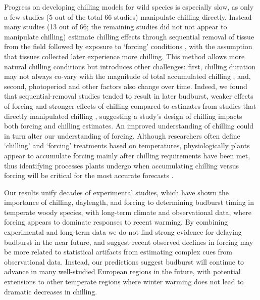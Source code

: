 \documentclass{article}
\begin{document}
\par Progress on developing chilling models for wild species is especially slow, as only a few studies (5 out of the total 66 studies) manipulate chilling directly. Instead many studies (13 out of 66; the remaining studies did not not appear to manipulate chilling) estimate chilling effects through sequential removal of tissue from the field followed by exposure to `forcing' conditions \citep{weinberger1950}, with the assumption that tissues collected later experience more chilling. This method allows more natural chilling conditions but introduces other challenges: first, chilling duration may not always co-vary with the magnitude of total accumulated chilling \citep{dennis2003}, and, second, photoperiod and other factors also change over time. Indeed, we found that sequential-removal studies tended to result in later budburst, weaker effects of forcing and stronger effects of chilling compared to estimates from studies that directly manipulated chilling \citep[Fig. 4S][]{weinberger1950,polgar2013}, suggesting a study's design of chilling impacts both forcing and chilling estimates. An improved understanding of chilling could in turn alter our understanding of forcing. Although researchers often define `chilling' and `forcing' treatments based on temperatures, physiologically plants appear to accumulate forcing mainly after chilling requirements have been met,  thus identifying processes plants undergo when accumulating chilling versus forcing will be critical for the most accurate forecasts \citep{chuine2016}.

\par Our results unify decades of experimental studies, which have shown the importance of chilling, daylength, and forcing to determining budburst timing in temperate woody species, with long-term climate and observational data, where forcing appears to dominate responses to recent warming. By combining experimental and long-term data we do not find strong evidence for delaying budburst in the near future, and suggest recent observed declines in forcing may be more related to statistical artifacts from estimating complex cues from observational data. Instead, our predictions suggest budburst will continue to advance in many well-studied European regions in the future, with potential extensions to other temperate regions where winter warming does not lead to dramatic decreases in chilling. 
\end{document}
